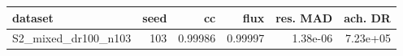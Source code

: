 \begin{tabular}{lrrrrr}
\toprule
dataset & seed & cc & flux & res. MAD & ach. DR \\
\midrule
S2\_mixed\_dr100\_n103 & 103 & 0.99986 & 0.99997 & 1.38e-06 & 7.23e+05 \\
\bottomrule
\end{tabular}